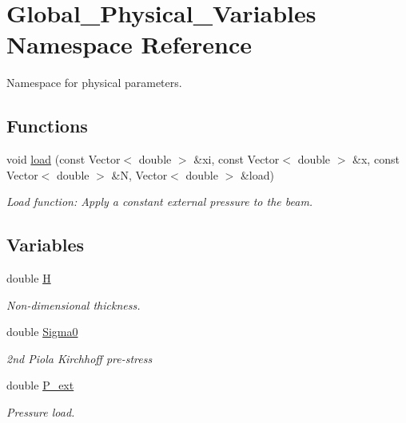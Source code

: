 \hypertarget{namespaceGlobal__Physical__Variables}{}\section{Global\+\_\+\+Physical\+\_\+\+Variables Namespace Reference}
\label{namespaceGlobal__Physical__Variables}


Namespace for physical parameters.  


\subsection*{Functions}
\begin{DoxyCompactItemize}
\item 
void \hyperlink{namespaceGlobal__Physical__Variables_a321267e1efb30b5d586302509354fb07}{load} (const Vector$<$ double $>$ \&xi, const Vector$<$ double $>$ \&x, const Vector$<$ double $>$ \&N, Vector$<$ double $>$ \&load)
\begin{DoxyCompactList}\small\item\em Load function\+: Apply a constant external pressure to the beam. \end{DoxyCompactList}\end{DoxyCompactItemize}
\subsection*{Variables}
\begin{DoxyCompactItemize}
\item 
double \hyperlink{namespaceGlobal__Physical__Variables_af6e07423e22c0991084d9a2f43727805}{H}
\begin{DoxyCompactList}\small\item\em Non-\/dimensional thickness. \end{DoxyCompactList}\item 
double \hyperlink{namespaceGlobal__Physical__Variables_a417dc688a70c4f06ef0faed047068ba2}{Sigma0}
\begin{DoxyCompactList}\small\item\em 2nd Piola Kirchhoff pre-\/stress \end{DoxyCompactList}\item 
double \hyperlink{namespaceGlobal__Physical__Variables_a0406c0cbd463d1df2458fe5de98a00eb}{P\+\_\+ext}
\begin{DoxyCompactList}\small\item\em Pressure load. \end{DoxyCompactList}\end{DoxyCompactItemize}


